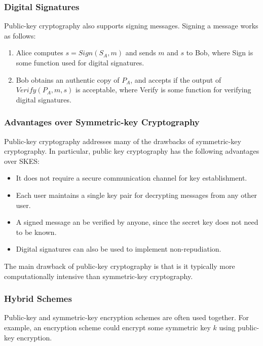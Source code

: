 \documentclass[12pt,titlepage]{article}
\begin{document}
      \subsubsection{Digital Signatures}
        Public-key cryptography also supports signing messages. Signing a message works as follows:
        \begin{enumerate}
          \item Alice computes $s = Sign(S_A, m)$ and sends $m$ and $s$ to Bob, where Sign is some function used
            for digital signatures.
          \item Bob obtains an authentic copy of $P_A$, and accepts if the output of $Verify(P_A, m, s)$ is
            acceptable, where Verify is some function for verifying digital signatures.
        \end{enumerate}

      \subsubsection{Advantages over Symmetric-key Cryptography}
        Public-key cryptography addresses many of the drawbacks of symmetric-key cryptography. In particular, public
        key cryptography has the following advantages over SKES:
        \begin{itemize}
          \item It does not require a secure communication channel for key establishment.
          \item Each user maintains a single key pair for decrypting messages from any other user.
          \item A signed message an be verified by anyone, since the secret key does not need to be known.
          \item Digital signatures can also be used to implement non-repudiation.
        \end{itemize}

        The main drawback of public-key cryptography is that is it typically more computationally intensive than
        symmetric-key cryptography.

      \subsubsection{Hybrid Schemes}
        Public-key and symmetric-key encryption schemes are often used together. For example, an encryption scheme
        could encrypt some symmetric key $k$ using public-key encryption.
\end{document}
